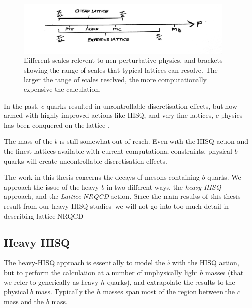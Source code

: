     \begin{figure}
      \vspace{-10pt}
      \begin{center}
        \includegraphics[width=
          0.95\textwidth]{images/scales.jpg}
      \end{center}
      \vspace{-15pt}
      \caption{Different scales relevent to non-perturbative physics, and brackets showing the range of scales that typical lattices can resolve. The larger the range of scales resolved, the more computationally expensive the calculation.}
    \end{figure}

    In the past, $c$ quarks resulted in uncontrollable discretisation effects, but now armed with highly improved actions like HISQ, and very fine lattices, $c$ physics has been conquered on the lattice \cite{Davies:2008nq,Davies:2008hs,Koponen:2011ev,Na:2011mc,Na:2012uh,Na:2012iu,Koponen:2013ila}.

    The mass of the $b$ is still somewhat out of reach. Even with the HISQ action and the finest lattices available with current computational constraints, physical $b$ quarks will create uncontrollable discretisation effects.

    The work in this thesis concerns the decays of mesons containing $b$ quarks. We approach the issue of the heavy $b$ in two different ways, the {\it{heavy-HISQ}} approach, and the {\it{Lattice NRQCD}} action. Since the main results of this thesis result from our heavy-HISQ studies, we will not go into too much detail in describing lattice NRQCD.

    \subsection{Heavy HISQ}

    The heavy-HISQ approach is essentially to model the $b$ with the HISQ action, but to perform the calculation at a number of unphysically light $b$ masses (that we refer to generically as heavy $h$ quarks), and extrapolate the results to the physical $b$ mass. Typically the $h$ masses span most of the region between the $c$ mass and the $b$ mass.

